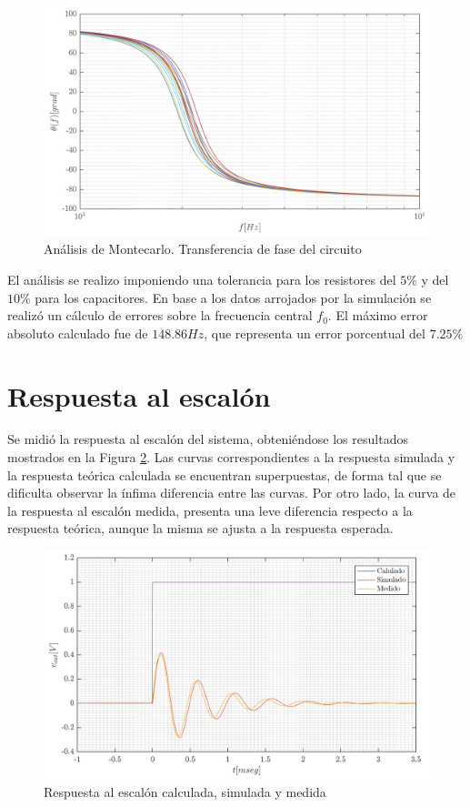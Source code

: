 \begin{figure}[H]
\centering
\includegraphics[scale=0.4]{../parte1/informe/resources/montecarlo_phase}
\caption{Análisis de Montecarlo. Transferencia de fase del circuito}
\label{1_mc_phase}
\end{figure}

El análisis se realizo imponiendo una tolerancia para los resistores del $5\%$ y del $10\%$ para los capacitores. En base a los datos arrojados por la simulación se realizó un cálculo de errores sobre la frecuencia central $f_0$. El máximo error absoluto calculado fue de $148.86Hz$, que representa un error porcentual del $7.25\%$


\section{Respuesta al escalón}
Se midió la respuesta al escalón del sistema, obteniéndose los resultados mostrados en la Figura \ref{1_step_response}. Las curvas correspondientes a la respuesta simulada y la respuesta teórica calculada se encuentran superpuestas, de forma tal que se dificulta observar la ínfima diferencia entre las curvas. Por otro lado, la curva de la respuesta al escalón medida, presenta una leve diferencia respecto a la respuesta teórica, aunque la misma se ajusta a la respuesta esperada.

\begin{figure}[H]
\centering
\includegraphics[scale=0.4]{../parte1/informe/resources/step_response}
\caption{Respuesta al escalón calculada, simulada y medida}
\label{1_step_response}
\end{figure}

